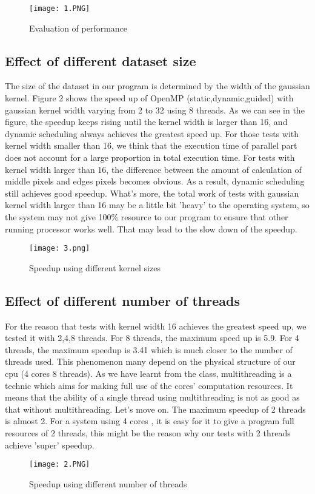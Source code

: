 \documentclass[letterpaper, 10 pt, conference]{ieeeconf}  %
\begin{document}
\begin{figure}[h]
 \centering
 \texttt{[image: 1.PNG]}
 \caption{Evaluation of performance}
 \end{figure}

\subsection{Effect of different dataset  size}
The size of the dataset in our program is determined by the width of the gaussian kernel. Figure 2 shows the speed up of OpenMP (static,dynamic,guided) with gaussian kernel width varying from 2 to 32 using 8 threads. As we can see in the figure, the speedup keeps rising until the kernel width is larger than 16, and dynamic scheduling always achieves the greatest speed up. For those tests with kernel width smaller than 16, we think that the execution time of parallel part does not account for a large proportion in total execution time. For tests with kernel width larger than 16, the difference between the amount of calculation of middle pixels and edges pixels becomes obvious. As a result, dynamic scheduling still achieves good speedup. What's more, the total work of tests with gaussian kernel width larger than 16 may be a little bit 'heavy' to the operating system, so the system may not give 100\% resource to our program to ensure that other running processor works well. That may lead to the slow down of the speedup.

\begin{figure}[h]
 \centering
 \texttt{[image: 3.png]}
 \caption{Speedup using different kernel sizes}
 \end{figure}
\subsection{Effect of different number of threads}
For the reason that tests with kernel width 16 achieves the greatest speed up, we tested it with 2,4,8 threads. For 8 threads, the maximum speed up is 5.9. For 4 threads, the maximum speedup is 3.41 which is much closer to the number of threads used. This phenomenon many depend on the physical structure of our cpu (4 cores 8 threads). As we have learnt from the class, multithreading is a technic which aims for making full use of the cores' computation resources. It means that the ability of a single thread using multithreading is not as good as that without multithreading. Let's move on. The maximum speedup of 2 threads is almost 2. For a system using 4 cores , it is easy for it to give a program full resources of 2 threads, this might be the reason why our tests with 2 threads achieve 'super' speedup.
 \begin{figure}[h]
 \centering
 \texttt{[image: 2.PNG]}
 \caption{Speedup using different number of threads}
 \end{figure}
\end{document}
